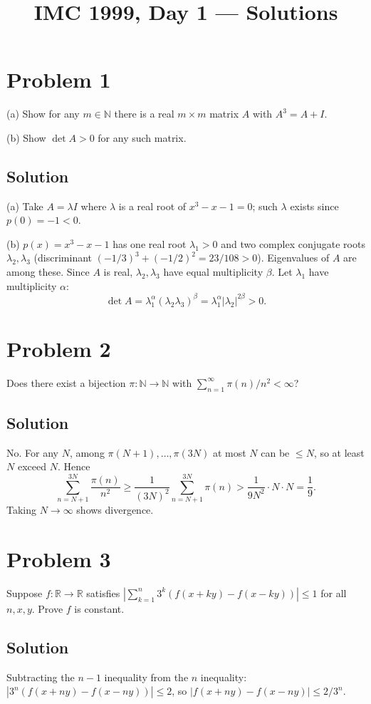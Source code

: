 \documentclass{article}
\title{IMC 1999, Day 1 --- Solutions}
\begin{document}
\maketitle

\section*{Problem 1}
(a) Show for any $m\in\mathbb{N}$ there is a real $m\times m$ matrix $A$ with $A^3 = A+I$.

(b) Show $\det A > 0$ for any such matrix.

\subsection*{Solution}
(a) Take $A = \lambda I$ where $\lambda$ is a real root of $x^3-x-1=0$; such $\lambda$ exists since $p(0)=-1<0$.

(b) $p(x)=x^3-x-1$ has one real root $\lambda_1>0$ and two complex conjugate roots $\lambda_2, \lambda_3$ (discriminant $(-1/3)^3+(-1/2)^2 = 23/108 > 0$). Eigenvalues of $A$ are among these. Since $A$ is real, $\lambda_2, \lambda_3$ have equal multiplicity $\beta$. Let $\lambda_1$ have multiplicity $\alpha$:
\[\det A = \lambda_1^\alpha (\lambda_2\lambda_3)^\beta = \lambda_1^\alpha |\lambda_2|^{2\beta} > 0.\]

\section*{Problem 2}
Does there exist a bijection $\pi:\mathbb{N}\to\mathbb{N}$ with $\sum_{n=1}^\infty \pi(n)/n^2 < \infty$?

\subsection*{Solution}
No. For any $N$, among $\pi(N+1),\dots,\pi(3N)$ at most $N$ can be $\le N$, so at least $N$ exceed $N$. Hence
\[\sum_{n=N+1}^{3N}\frac{\pi(n)}{n^2} \ge \frac{1}{(3N)^2}\sum_{n=N+1}^{3N}\pi(n) > \frac{1}{9N^2}\cdot N\cdot N = \frac 19.\]
Taking $N\to\infty$ shows divergence.

\section*{Problem 3}
Suppose $f:\mathbb{R}\to\mathbb{R}$ satisfies $\left|\sum_{k=1}^n 3^k(f(x+ky)-f(x-ky))\right|\le 1$ for all $n,x,y$. Prove $f$ is constant.

\subsection*{Solution}
Subtracting the $n-1$ inequality from the $n$ inequality: $|3^n(f(x+ny)-f(x-ny))|\le 2$, so $|f(x+ny)-f(x-ny)|\le 2/3^n$.
\end{document}
